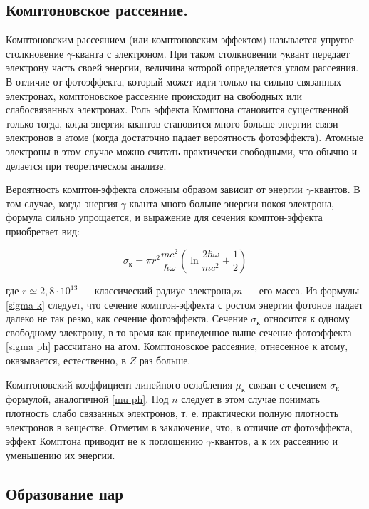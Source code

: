 		\subsection{Комптоновское рассеяние.} 
		Комптоновским рассеянием (или комптоновским эффектом) называется упругое столкновение $\gamma$-кванта с электроном. При таком столкновении $\gamma$квант передает электрону часть своей энергии, величина которой определяется углом рассеяния. В отличие от фотоэффекта, который может идти только на сильно связанных электронах, комптоновское рассеяние происходит на свободных или слабосвязанных электронах. Роль эффекта Комптона становится
		существенной только тогда, когда энергия квантов становится много
		больше энергии связи электронов в атоме (когда достаточно падает
		вероятность фотоэффекта). Атомные электроны в этом случае можно
		считать практически свободными, что обычно и делается при теоретическом анализе.
		
		Вероятность комптон-эффекта сложным образом зависит от энергии $\gamma$-квантов. В том случае, когда энергия
		$\gamma$-кванта много больше энергии покоя электрона, формула сильно
		упрощается, и выражение для сечения комптон-эффекта приобретает  вид:
		
		\begin{equation}\label{sigma k}
		\sigma_к = \pi r^2 \dfrac{mc^2}{\hbar\omega} \left( \ln{\dfrac{2\hbar\omega}{mc^2} + \dfrac{1}{2}} \right) 
		\end{equation}
		
		где $ r \simeq 2,8 \cdot 10^{13} $ --- классический радиус электрона,$ m $ --- его масса. Из формулы \eqref{sigma k} следует, что сечение комптон-эффекта с ростом энергии фотонов падает далеко не так резко, как сечение фотоэффекта.
		Сечение $ \sigma_к $ относится к одному свободному электрону, в то время как приведенное выше сечение фотоэффекта \eqref{sigma ph} рассчитано на атом.
		Комптоновское рассеяние, отнесенное к атому, оказывается, естественно, в $ Z $ раз больше. 
		
		Комптоновский коэффициент линейного ослабления $ \mu_к $ связан с
		сечением $ \sigma_к $ формулой, аналогичной \eqref{mu ph}. Под $ n $ следует в этом случае понимать плотность слабо связанных электронов, т. е. практически полную плотность электронов в веществе.
		Отметим в заключение, что, в отличие от фотоэффекта, эффект
		Комптона приводит не к поглощению $\gamma$-квантов, а к их рассеянию и
		уменьшению их энергии.
		
		\subsection{Образование пар}
		
